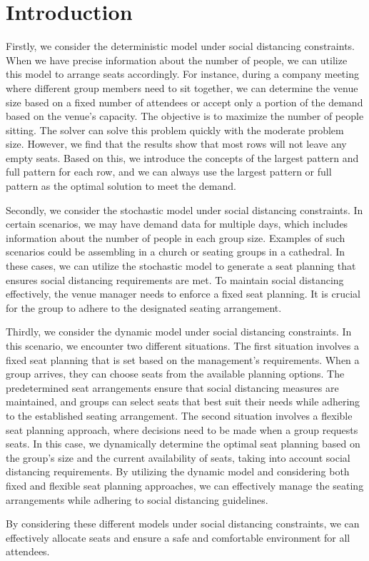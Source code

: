 \section{Introduction}

Firstly, we consider the deterministic model under social distancing constraints. When we have precise information about the number of people, we can utilize this model to arrange seats accordingly. For instance, during a company meeting where different group members need to sit together, we can determine the venue size based on a fixed number of attendees or accept only a portion of the demand based on the venue's capacity. The objective is to maximize the number of people sitting. The solver can solve this problem quickly with the moderate problem size. However, we find that the results show that most rows will not leave any empty seats. Based on this, we introduce the concepts of the largest pattern and full pattern for each row, and we can always use the largest pattern or full pattern as the optimal solution to meet the demand.


Secondly, we consider the stochastic model under social distancing constraints. In certain scenarios, we may have demand data for multiple days, which includes information about the number of people in each group size. Examples of such scenarios could be assembling in a church or seating groups in a cathedral. In these cases, we can utilize the stochastic model to generate a seat planning that ensures social distancing requirements are met. To maintain social distancing effectively, the venue manager needs to enforce a fixed seat planning. It is crucial for the group to adhere to the designated seating arrangement.


Thirdly, we consider the dynamic model under social distancing constraints. In this scenario, we encounter two different situations. The first situation involves a fixed seat planning that is set based on the management's requirements. When a group arrives, they can choose seats from the available planning options. The predetermined seat arrangements ensure that social distancing measures are maintained, and groups can select seats that best suit their needs while adhering to the established seating arrangement. The second situation involves a flexible seat planning approach, where decisions need to be made when a group requests seats. In this case, we dynamically determine the optimal seat planning based on the group's size and the current availability of seats, taking into account social distancing requirements. By utilizing the dynamic model and considering both fixed and flexible seat planning approaches, we can effectively manage the seating arrangements while adhering to social distancing guidelines.



By considering these different models under social distancing constraints, we can effectively allocate seats and ensure a safe and comfortable environment for all attendees.
\newpage
